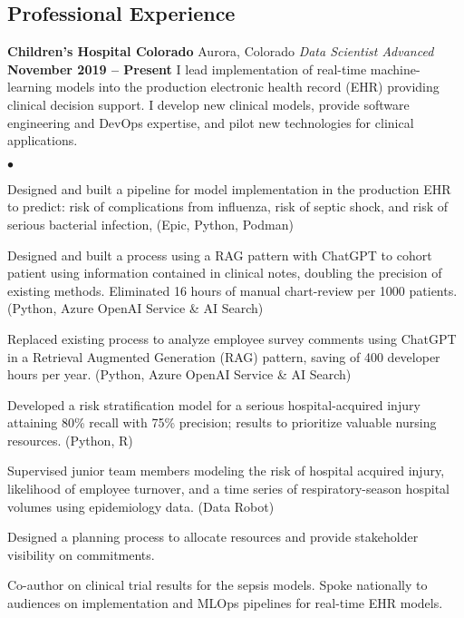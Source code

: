 \documentclass[margin,line, 11pt]{res}
\newenvironment{list2}{
  \begin{list}{$\bullet$}{%
      \setlength{\itemsep}{0in}
      \setlength{\parsep}{0in} \setlength{\parskip}{0in}
      \setlength{\topsep}{0in} \setlength{\partopsep}{0in}
      \setlength{\leftmargin}{0.2in}}}{\end{list}}
\begin{document}
\begin{resume}
\section{Professional \newline Experience}
\textbf{Children's Hospital Colorado} \hfill Aurora, Colorado\newline
\textit{Data Scientist Advanced} \hfill \textbf{November 2019 -- Present}\newline
I lead implementation of real-time machine-learning models into the production electronic health record (EHR) providing clinical decision support. I develop new clinical models, provide software engineering and DevOps expertise, and pilot new technologies for clinical applications.
    \begin{list2}
      \item Designed and built a pipeline for model implementation in the production EHR to predict: risk of complications from influenza, risk of septic shock, and risk of serious bacterial infection, (Epic, Python, Podman)
      \item Designed and built a process using a RAG pattern with ChatGPT to cohort patient using information contained in clinical notes, doubling the precision of existing methods. Eliminated 16 hours of manual chart-review per 1000 patients. (Python, Azure OpenAI Service \& AI Search)
      \item Replaced existing process to analyze employee survey comments using ChatGPT in a Retrieval Augmented Generation (RAG) pattern, saving of 400 developer hours per year. (Python, Azure OpenAI Service \& AI Search)
      \item Developed a risk stratification model for a serious hospital-acquired injury attaining 80\% recall with 75\% precision; results to prioritize valuable nursing resources. (Python, R)
      \item Supervised junior team members modeling the risk of hospital acquired injury, likelihood of employee turnover, and a time series of respiratory-season hospital volumes using epidemiology data. (Data Robot)
      \item Designed a planning process to allocate resources and provide stakeholder visibility on commitments.
      \item Co-author on clinical trial results for the sepsis models. Spoke nationally to audiences on implementation and MLOps pipelines for real-time EHR models.
    \end{list2}
\vspace*{-2mm}


\end{resume}
\end{document}
